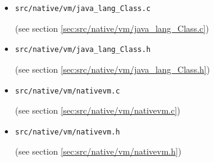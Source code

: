 \documentclass[a4paper, 10pt, titlepage]{scrartcl} %
\begin{document}
\begin{itemize}
 \item \begin{scriptsize}\verb|src|\hspace{0.0pt}\verb|/|\hspace{0.0pt}\verb|native|\hspace{0.0pt}\verb|/|\hspace{0.0pt}\verb|vm|\hspace{0.0pt}\verb|/|\hspace{0.0pt}\verb|java_lang_Class|\hspace{0.0pt}\verb|.|\hspace{0.0pt}\verb|c|\end{scriptsize} (see section \ref{sec:src/native/vm/java_lang_Class.c})
 \item \begin{scriptsize}\verb|src|\hspace{0.0pt}\verb|/|\hspace{0.0pt}\verb|native|\hspace{0.0pt}\verb|/|\hspace{0.0pt}\verb|vm|\hspace{0.0pt}\verb|/|\hspace{0.0pt}\verb|java_lang_Class|\hspace{0.0pt}\verb|.|\hspace{0.0pt}\verb|h|\end{scriptsize} (see section \ref{sec:src/native/vm/java_lang_Class.h})
 \item \begin{scriptsize}\verb|src|\hspace{0.0pt}\verb|/|\hspace{0.0pt}\verb|native|\hspace{0.0pt}\verb|/|\hspace{0.0pt}\verb|vm|\hspace{0.0pt}\verb|/|\hspace{0.0pt}\verb|nativevm|\hspace{0.0pt}\verb|.|\hspace{0.0pt}\verb|c|\end{scriptsize} (see section \ref{sec:src/native/vm/nativevm.c})
 \item \begin{scriptsize}\verb|src|\hspace{0.0pt}\verb|/|\hspace{0.0pt}\verb|native|\hspace{0.0pt}\verb|/|\hspace{0.0pt}\verb|vm|\hspace{0.0pt}\verb|/|\hspace{0.0pt}\verb|nativevm|\hspace{0.0pt}\verb|.|\hspace{0.0pt}\verb|h|\end{scriptsize} (see section \ref{sec:src/native/vm/nativevm.h})

\end{itemize}
\end{document}
